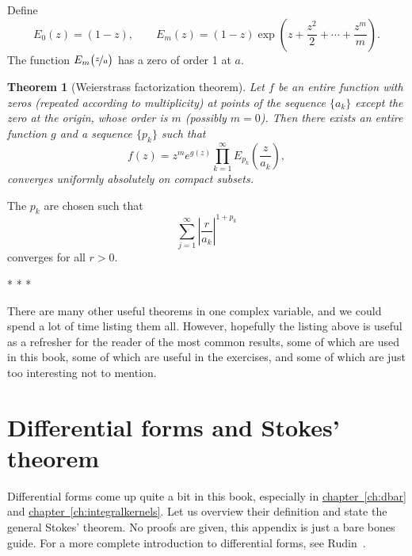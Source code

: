 \documentclass[12pt,openany]{book}
\newcommand{\abs}[1]{\left\lvert {#1} \right\rvert}
\theoremstyle{plain}
\newtheorem{thm}{Theorem}[section]
\theoremstyle{remark}
\theoremstyle{definition}
\theoremstyle{exercise}
\theoremstyle{example}
\newcommand{\chapterref}[1]{\hyperref[#1]{chapter~\ref*{#1}}}
\begin{document}
Define
\begin{equation*}
E_0(z) = (1-z), \qquad
E_m(z) = (1-z) \exp\left( z +\frac{z^2}{2} + \cdots + \frac{z^m}{m} \right)
.
\end{equation*}
The function $E_m\bigl(\nicefrac{z}{a}\bigr)$ has a zero of order 1 at $a$.

\begin{thm}[Weierstrass factorization theorem]
Let $f$ be an entire function with zeros (repeated according to multiplicity) at points of
the sequence $\{ a_k \}$ except the zero at
the origin, whose order is $m$ (possibly $m=0$).  Then there exists an
entire function $g$ and a sequence $\{ p_k \}$ such that
\begin{equation*}
f(z) = z^m e^{g(z)} \prod_{k=1}^\infty E_{p_k}\left(\frac{z}{a_k}\right) ,
\end{equation*}
converges uniformly absolutely on compact subsets.
\end{thm}

The $p_k$ are chosen such that
\begin{equation*}
\sum_{j=1}^\infty {\abs{\frac{r}{a_k}}}^{1+p_k}
\end{equation*}
converges for all $r > 0$.

\begin{center}
* * *
\end{center}

There are many other useful theorems in one complex variable, and we could
spend a lot of time listing them all.
However, hopefully the listing above is useful
as a refresher for the reader of the most common results, some of which are
used in this book, some of which are useful in the exercises, and some of
which are just too interesting not to mention.



\chapter{Differential forms and Stokes' theorem} \label{ap:diffforms}


Differential forms come up quite a bit in this book, especially
in \chapterref{ch:dbar} and \chapterref{ch:integralkernels}.
Let us overview their definition
and state the general Stokes' theorem.  No proofs are given, this appendix
is just a bare bones guide.
For a more complete introduction to differential forms,
see Rudin~\cite{Rudin:principles}.
\end{document}
